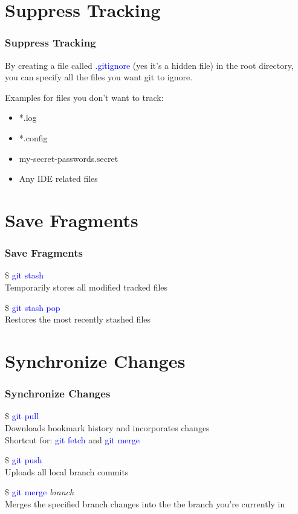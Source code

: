 \documentclass[aspectratio=169]{beamer}
\begin{document}
\section{Suppress Tracking}
\begin{frame}

\frametitle{Suppress Tracking}

By creating a file called \textcolor{blue}{.gitignore} (yes it's a hidden file) in the root directory, you can specify all the files you want git to ignore.

\pause

Examples for files you don't want to track:

\begin{itemize}

\item *.log
\item *.config
\item my-secret-passwords.secret
\item Any IDE related files

\end{itemize}

\end{frame}

\section{Save Fragments}
\begin{frame}

\frametitle{Save Fragments}

\$ \textcolor{blue}{git stash}\\
Temporarily stores all modified tracked files

\pause

\$ \textcolor{blue}{git stash pop}\\
Restores the most recently stashed files

\end{frame}

\section{Synchronize Changes}
\begin{frame}

\frametitle{Synchronize Changes}

\$ \textcolor{blue}{git pull}\\
Downloads bookmark history and incorporates changes\\
Shortcut for: \textcolor{blue}{git fetch} and \textcolor{blue}{git merge}

\pause

\$ \textcolor{blue}{git push}\\
Uploads all local branch commits

\pause

\$ \textcolor{blue}{git merge} \textit{branch}\\
Merges the specified branch changes into the the branch you're currently in

\end{frame}
\end{document}
